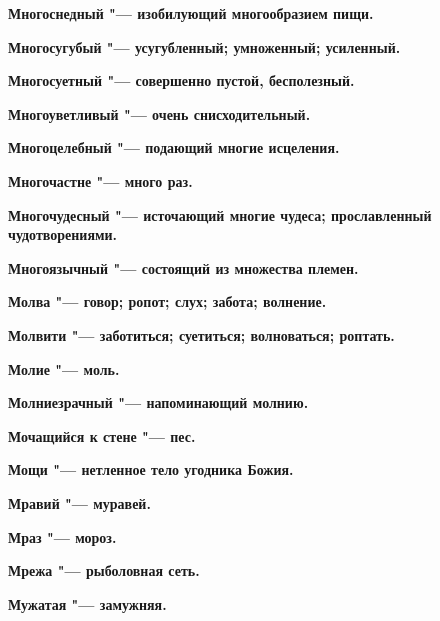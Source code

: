 \begin{multicols}{2}
\bfseries Многоснедный\normalfont{} "--- изобилующий многообразием пищи. 




\bfseries Многосугубый\normalfont{} "--- усугубленный; умноженный; усиленный. 




\bfseries Многосуетный\normalfont{} "--- совершенно пустой, бесполезный. 




\bfseries Многоуветливый\normalfont{} "--- очень снисходительный. 




\bfseries Многоцелебный\normalfont{} "--- подающий многие исцеления. 




\bfseries Многочастне\normalfont{} "--- много раз. 




\bfseries Многочудесный\normalfont{} "--- источающий многие чудеса; прославленный чудотворениями. 




\bfseries Многоязычный\normalfont{} "--- состоящий из множества племен. 




\bfseries Молва\normalfont{} "--- говор; ропот; слух; забота; волнение. 




\bfseries Молвити\normalfont{} "--- заботиться; суетиться; волноваться; роптать. 




\bfseries Молие\normalfont{} "--- моль. 




\bfseries Молниезрачный\normalfont{} "--- напоминающий молнию. 




\bfseries Мочащийся к стене\normalfont{} "--- пес. 




\bfseries Мощи\normalfont{} "--- нетленное тело угодника Божия. 




\bfseries Мравий\normalfont{} "--- муравей. 




\bfseries Мраз\normalfont{} "--- мороз. 




\bfseries Мрежа\normalfont{} "--- рыболовная сеть. 




\bfseries Мужатая\normalfont{} "--- замужняя. 





\end{multicols}
